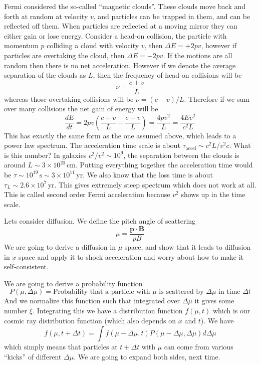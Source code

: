 \documentclass[letterpaper, 11pt]{article}
\numberwithin{equation}{section}
\numberwithin{figure}{section}
\begin{document}
Fermi considered the so-called ``magnetic clouds''. These clouds move back and
forth at random at velocity $v$, and particles can be trapped in them, and can
be reflected off them. When particles are reflected at a moving mirror they can
either gain or lose energy. Consider a head-on collision, the particle with
momentum $p$ colliding a cloud with velocity $v$, then $\Delta E = +2pv$,
however if particles are overtaking the cloud, then $\Delta E = -2pv$. If the
motions are all random then there is no net acceleration. However if we denote
the average separation of the clouds as $L$, then the frequency of head-on
collisions will be
\begin{equation}
  \label{eq:7}
  \nu = \frac{c + v}{L}
\end{equation}
whereas those overtaking collisions will be $\nu = (c - v)/L$. Therefore if we
sum over many collisions the net gain of energy will be
\begin{equation}
  \label{eq:8}
  \frac{dE}{dt} = 2pv \left( \frac{c + v}{L} - \frac{c - v}{L} \right) = \frac{4pv^2}{L} = \frac{4Ev^2}{c^2L}
\end{equation}
This has exactly the same form as the one assumed above, which leads to a power
law spectrum. The acceleration time scale is about $\tau_\mathrm{accel} \sim
c^2L/v^2c$. What is this number? In galaxies $c^2/v^2 \sim 10^9$, the separation
between the clouds is around $L\sim 3\times 10^{20}\,\mathrm{cm}$. Putting
everything together the acceleration time would be $\tau \sim
10^{19}\,\mathrm{s} \sim 3\times 10^{11}\,\mathrm{yr}$. We also know that the
loss time is about $\tau_L\sim 2.6\times 10^7\,\mathrm{yr}$. This gives
extremely steep spectrum which does not work at all. This is called second order
Fermi acceleration because $v^2$ shows up in the time scale.

Lets consider diffusion. We define the pitch angle of scattering
\begin{equation}
  \label{eq:9}
  \mu = \frac{\mathbf{p}\cdot \mathbf{B}}{pB}
\end{equation}
We are going to derive a diffusion in $\mu$ space, and show that it leads to
diffusion in $x$ space and apply it to shock acceleration and worry about how to
make it self-consistent.

We are going to derive a probability function
\begin{equation}
  \label{eq:10}
  P(\mu, \Delta \mu) = \text{Probability that a particle with $\mu$ is scattered by $\Delta \mu$ in time $\Delta t$}
\end{equation}
And we normalize this function such that integrated over $\Delta \mu$ it gives
some number $\xi$. Integrating this we have a distribution function $f(\mu, t)$
which is our cosmic ray distribution function (which also depends on $x$ and
$t$). We have
\begin{equation}
  \label{eq:11}
  f(\mu, t + \Delta t) = \int f(\mu - \Delta \mu, t)P(\mu - \Delta \mu, \Delta \mu) d\Delta \mu
\end{equation}
which simply means that particles at $t + \Delta t$ with $\mu$ can come from
various ``kicks'' of different $\Delta \mu$. We are going to expand both sides,
next time.
\end{document}
